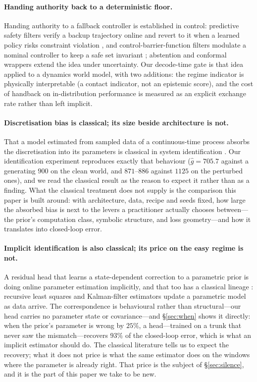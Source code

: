 \documentclass{article}
\begin{document}
\paragraph{Handing authority back to a deterministic floor.} Handing authority to a fallback controller is established in control: predictive safety filters verify a backup trajectory online and revert to it when a learned policy risks constraint violation \citep{wabersich2021}, and control-barrier-function filters modulate a nominal controller to keep a safe set invariant \citep{ames2019}; abstention and conformal wrappers extend the idea under uncertainty. Our decode-time gate is that idea applied to a dynamics world model, with two additions: the regime indicator is physically interpretable (a contact indicator, not an epistemic score), and the cost of handback on in-distribution performance is measured as an explicit exchange rate rather than left implicit.

\paragraph{Discretisation bias is classical; its size beside architecture is not.} That a model estimated from sampled data of a continuous-time process absorbs the discretisation into its parameters is classical in system identification \citep{ljung1999}. Our identification experiment reproduces exactly that behaviour ($\hat g = 705.7$ against a generating $900$ on the clean world, and $871$--$886$ against $1125$ on the perturbed ones), and we read the classical result as the reason to expect it rather than as a finding. What the classical treatment does not supply is the comparison this paper is built around: with architecture, data, recipe and seeds fixed, how large the absorbed bias is next to the levers a practitioner actually chooses between---the prior's computation class, symbolic structure, and loss geometry---and how it translates into closed-loop error.

\paragraph{Implicit identification is also classical; its price on the easy regime is not.} A residual head that learns a state-dependent correction to a parametric prior is doing online parameter estimation implicitly, and that too has a classical lineage \citep{ljung1999}: recursive least squares and Kalman-filter estimators update a parametric model as data arrive. The correspondence is behavioural rather than structural---our head carries no parameter state or covariance---and \S\ref{sec:when} shows it directly: when the prior's parameter is wrong by $25\%$, a head---trained on a trunk that never saw the mismatch---recovers $93\%$ of the closed-loop error, which is what an implicit estimator should do. The classical literature tells us to expect the recovery; what it does not price is what the same estimator does on the windows where the parameter is already right. That price is the subject of \S\ref{sec:silence}, and it is the part of this paper we take to be new.
\end{document}
